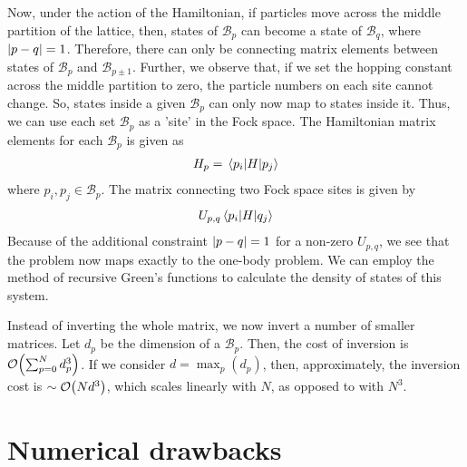 	Now, under the action of the Hamiltonian, if particles move across the middle partition of the lattice, then, states of $ \mathcal{B}_p $ can become a state of $ \mathcal{B}_{q} $, where $ \abs{p-q} = 1 $. Therefore, there can only be connecting matrix elements between states of $ \mathcal{B}_p $ and $ \mathcal{B}_{p \pm 1} $. Further, we observe that, if we set the hopping constant across the middle partition to zero, the particle numbers on each site cannot change. So, states inside a given $ \mathcal{B}_p $ can only now map to states inside it. Thus, we can use each set $ \mathcal{B}_p $ as a 'site' in the Fock space. The Hamiltonian matrix elements for each $ \mathcal{B}_p $ is given as
	\begin{align}
		H_{p} = \mel{p_i}{H}{p_j}
	\end{align}
	where $ p_i, p_j \in \mathcal{B}_p$. The matrix connecting two Fock space sites is given by \begin{align}
		U_{p,q}\mel{p_i}{H}{q_j}
	\end{align}
	Because of the additional constraint $ \abs{p-q} = 1 $ for a non-zero $ U_{p,q} $, we see that the problem now maps exactly to the one-body problem. We can employ the method of recursive Green's functions to calculate the density of states of this system.
	
	Instead of inverting the whole matrix, we now invert a number of smaller matrices.
	Let $ d_p $ be the dimension of a $ \mathcal{B}_p $. Then, the cost of inversion is $ \order{\sum_{p=0}^{N} d^{3}_p} $. If we consider $ d = \max_p \left( d_p \right)  $, then, approximately, the inversion cost is $ \sim \order{N d^3} $, which scales linearly with $ N $, as opposed to with $ N^3 $. 
	
\section{Numerical drawbacks}
	
	
	
	
	
	
	